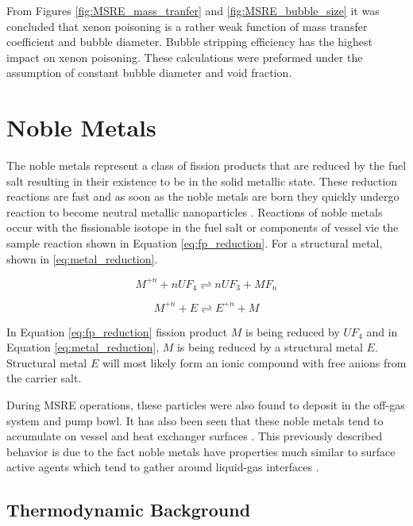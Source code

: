 \FloatBarrier
\newpage

From Figures \ref{fig:MSRE_mass_tranfer} and \ref{fig:MSRE_bubble_size} it was concluded that xenon poisoning is a rather weak function of mass transfer coefficient and bubble diameter. Bubble stripping efficiency has the highest impact on xenon poisoning. These calculations were preformed under the assumption of constant bubble diameter and void fraction. 


\section{Noble Metals}

The noble metals represent a class of fission products that are reduced by the fuel salt resulting in their existence to be in the solid metallic state.  These reduction reactions are fast and as soon as the noble metals are born they quickly undergo reaction to become neutral metallic nanoparticles \cite{kedl1972}. Reactions of noble metals occur with the fissionable isotope in the fuel salt or components of vessel vie the sample reaction shown in Equation \ref{eq:fp_reduction}. For a structural metal, shown in \ref{eq:metal_reduction}.  

 \begin{equation}
	M^{+n} + nUF_{4} \rightleftharpoons nUF_{3} + MF_{n}
	\label{eq:fp_reduction}
\end{equation}

 \begin{equation}
	M^{+n} + E \rightleftharpoons E^{+n} + M
	\label{eq:metal_reduction}
\end{equation}

In Equation \ref{eq:fp_reduction} fission product $M$ is being reduced by $UF_{4}$ and in Equation \ref{eq:metal_reduction}, $M$ is being reduced by a structural metal $E$. Structural metal $E$ will most likely form an ionic compound with free anions from the carrier salt. 

During MSRE operations, these particles were also found to deposit in the off-gas system and pump bowl. It has also been seen that these noble metals tend to accumulate on vessel and heat exchanger surfaces \cite{kedl1972}. This previously described behavior is due to the fact noble metals have properties much similar to surface active agents which tend to gather around liquid-gas interfaces \cite{kedl1972}. 

\subsection{Thermodynamic Background}

